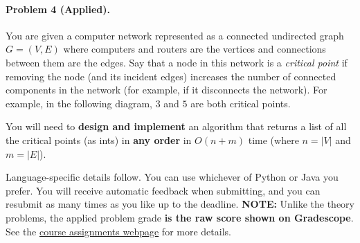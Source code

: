 \documentclass[11pt]{article}
\begin{document}
\newpage
\paragraph{Problem 4 (Applied).} You are given a computer network represented as a connected undirected graph $G=(V, E)$ where computers and routers are the vertices and connections between them are the edges. Say that a node in this network is a \textit{critical point} if removing the node (and its incident edges) increases the number of connected components in the network (for example, if it disconnects the network). For example, in the following diagram, $3$ and $5$ are both critical points.

\begin{figure}[!h]
\centering
{}
\end{figure}

You will need to \textbf{design and implement} an algorithm that returns a list of all the critical points (as ints) in \textbf{any order} in $O(n+m)$ time (where $n=|V|$ and $m=|E|$). 

Language-specific details follow. You can use whichever of Python or Java you prefer. You will receive automatic feedback when submitting, and you can resubmit as many times as you like up to the deadline. \textbf{NOTE:} Unlike the theory problems, the applied problem grade \textbf{is the raw score shown on Gradescope}. See the \href{https://sites.duke.edu/spring24compsci330/assignments/}{course assignments webpage} for more details. 
\end{document}
